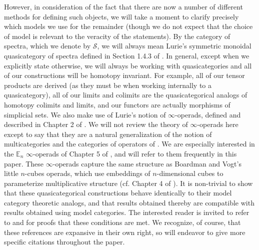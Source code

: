 \documentclass{article}
\theoremstyle{definition}
\theoremstyle{plain}
\renewcommand{\S}{\mathcal{S}}
\newcommand{\E}{\mathbb{E}}
\begin{document}
 However, in consideration of the fact that there are now a number of different methods for defining such objects, we will take a moment to clarify precisely which models we use for the remainder (though we do not expect that the choice of model is relevant to the veracity of the statements). By the category of spectra, which we denote by $\S$, we will always mean Lurie's symmetric monoidal quasicategory of spectra defined in Section 1.4.3 of \cite{ha}. In general, except when we explicitly state otherwise, we will always be working with quasicategories and all of our constructions will be homotopy invariant. For example, all of our tensor products are derived (as they must be when working internally to a quasicategory), all of our limits and colimits are the quasicategorical analogs of homotopy colimits and limits, and our functors are actually morphisms of simplicial sets. We also make use of Lurie's notion of $\infty$-operads, defined and described in Chapter 2 of \cite{ha}. We will not review the theory of $\infty$-operads here except to say that they are a natural generalization of the notion of multicategories and the categories of operators of \cite{maythom}. We are especially interested in the $\E_n$ $\infty$-operads of Chapter 5 of \cite{ha}, and will refer to them frequently in this paper. These $\infty$-operads capture the same structure as Boardman and Vogt's little $n$-cubes operads, which use embeddings of $n$-dimensional cubes to parameterize multiplicative structure (cf. Chapter 4 of \cite{maygeom}). It is non-trivial to show that these quasicategorical constructions behave identically to their model category theoretic analogs, and that results obtained thereby are compatible with results obtained using model categories. The interested reader is invited to refer to \cite{htt} and \cite{ha} for proofs that these conditions are met. We recognize, of course, that these references are expansive in their own right, so will endeavor to give more specific citations throughout the paper.
\end{document}
